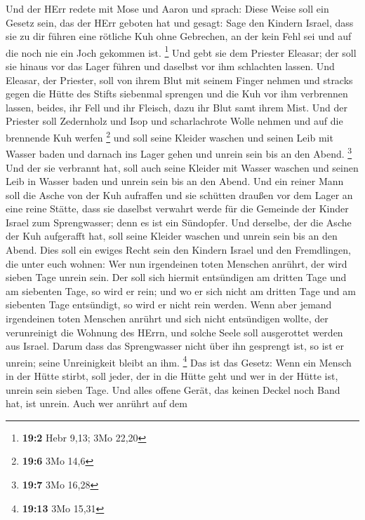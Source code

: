  Und der HErr redete mit Mose und Aaron und sprach:
 Diese Weise soll ein Gesetz sein, das der HErr geboten
hat und gesagt: Sage den Kindern Israel, dass sie zu dir führen eine
rötliche Kuh ohne Gebrechen, an der kein Fehl sei und auf die noch nie
ein Joch gekommen ist. \footnote{\textbf{19:2} Hebr 9,13; 3Mo 22,20}
 Und gebt sie dem Priester Eleasar; der soll sie hinaus
vor das Lager führen und daselbst vor ihm schlachten lassen.
 Und Eleasar, der Priester, soll von ihrem Blut mit seinem
Finger nehmen und stracks gegen die Hütte des Stifts siebenmal sprengen
 und die Kuh vor ihm verbrennen lassen, beides, ihr Fell
und ihr Fleisch, dazu ihr Blut samt ihrem Mist.  Und der
Priester soll Zedernholz und Isop und scharlachrote Wolle nehmen und auf
die brennende Kuh werfen \footnote{\textbf{19:6} 3Mo 14,6}
 und soll seine Kleider waschen und seinen Leib mit Wasser
baden und darnach ins Lager gehen und unrein sein bis an den Abend.
\footnote{\textbf{19:7} 3Mo 16,28}  Und der sie verbrannt
hat, soll auch seine Kleider mit Wasser waschen und seinen Leib in
Wasser baden und unrein sein bis an den Abend.  Und ein
reiner Mann soll die Asche von der Kuh aufraffen und sie schütten
draußen vor dem Lager an eine reine Stätte, dass sie daselbst verwahrt
werde für die Gemeinde der Kinder Israel zum Sprengwasser; denn es ist
ein Sündopfer.  Und derselbe, der die Asche der Kuh
aufgerafft hat, soll seine Kleider waschen und unrein sein bis an den
Abend. Dies soll ein ewiges Recht sein den Kindern Israel und den
Fremdlingen, die unter euch wohnen:  Wer nun irgendeinen
toten Menschen anrührt, der wird sieben Tage unrein sein.
 Der soll sich hiermit entsündigen am dritten Tage und am
siebenten Tage, so wird er rein; und wo er sich nicht am dritten Tage
und am siebenten Tage entsündigt, so wird er nicht rein werden.
 Wenn aber jemand irgendeinen toten Menschen anrührt und
sich nicht entsündigen wollte, der verunreinigt die Wohnung des HErrn,
und solche Seele soll ausgerottet werden aus Israel. Darum dass das
Sprengwasser nicht über ihn gesprengt ist, so ist er unrein; seine
Unreinigkeit bleibt an ihm. \footnote{\textbf{19:13} 3Mo 15,31}
 Das ist das Gesetz: Wenn ein Mensch in der Hütte stirbt,
soll jeder, der in die Hütte geht und wer in der Hütte ist, unrein sein
sieben Tage.  Und alles offene Gerät, das keinen Deckel
noch Band hat, ist unrein.  Auch wer anrührt auf dem
